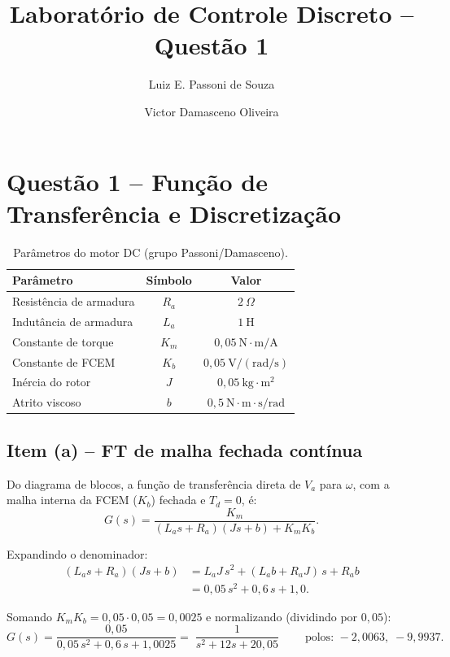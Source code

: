 \documentclass[11pt,a4paper]{article}
\title{Laborat\'orio de Controle Discreto -- Quest\~ao 1}
\author{Luiz E. Passoni de Souza \and Victor Damasceno Oliveira}
\date{}
\begin{document}
\maketitle

\section{Quest\~ao 1 -- Fun\c{c}\~ao de Transfer\^encia e Discretiza\c{c}\~ao}

\begin{table}[h]
\centering
\caption{Par\^ametros do motor DC (grupo Passoni/Damasceno).}
\begin{tabular}{lcc}
\toprule
Par\^ametro & S\'imbolo & Valor \\
\midrule
Resist\^encia de armadura & $R_a$ & $2~\Omega$ \\
Indut\^ancia de armadura  & $L_a$ & $1~\mathrm{H}$ \\
Constante de torque       & $K_m$ & $0{,}05~\mathrm{N\cdot m/A}$ \\
Constante de FCEM         & $K_b$ & $0{,}05~\mathrm{V/(rad/s)}$ \\
In\'ercia do rotor        & $J$   & $0{,}05~\mathrm{kg\cdot m^2}$ \\
Atrito viscoso            & $b$   & $0{,}5~\mathrm{N\cdot m\cdot s/rad}$ \\
\bottomrule
\end{tabular}
\end{table}

\subsection{Item (a) -- FT de malha fechada cont\'inua}

Do diagrama de blocos, a fun\c{c}\~ao de transfer\^encia direta de $V_a$ para $\omega$,
com a malha interna da FCEM ($K_b$) fechada e $T_d = 0$, \'e:
\begin{equation}
G(s)=\frac{K_m}{(L_a s+R_a)(Js+b)+K_mK_b}.
\end{equation}

Expandindo o denominador:
\begin{align}
(L_a s+R_a)(Js+b) &= L_aJ\,s^2+(L_ab+R_aJ)\,s+R_ab \nonumber\\
                  &= 0{,}05\,s^2+0{,}6\,s+1{,}0 .
\end{align}

Somando $K_mK_b = 0{,}05\cdot 0{,}05 = 0{,}0025$ e normalizando (dividindo por $0{,}05$):
\begin{equation}
G(s)=\frac{0{,}05}{0{,}05\,s^2+0{,}6\,s+1{,}0025}
     =\boxed{\;\dfrac{1}{s^2+12s+20{,}05}\;}
\qquad \text{polos: } -2{,}0063,\; -9{,}9937 .
\end{equation}
\end{document}
